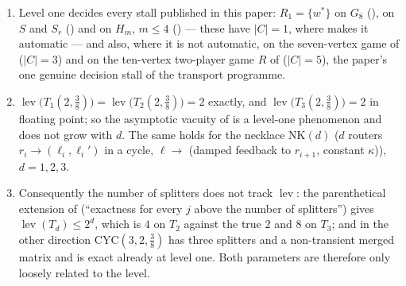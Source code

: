 \begin{proposition}\label{xc:stops}
\begin{enumerate}[label=(\alph*),leftmargin=2.2em]
\item Level one decides every stall published in this paper: $R_1=\{w^{\ast}\}$ on $G_8$
      (), on $S$ and $S_r$ () and on
      $H_m$, $m\le4$ () --- these have $|C|=1$, where
       makes it automatic --- and also, where it is not automatic, on the
      seven-vertex game of  ($|C|=3$) and on the ten-vertex two-player
      game $R$ of  ($|C|=5$), the paper's one genuine decision stall of
      the transport programme.
\item $\operatorname{lev}\bigl(T_1(2,\tfrac38)\bigr)=\operatorname{lev}\bigl(T_2(2,\tfrac38)\bigr)=2$
      exactly, and $\operatorname{lev}\bigl(T_3(2,\tfrac38)\bigr)=2$ in floating point; so the asymptotic vacuity
      of  is a level-one phenomenon and does not grow with $d$.  The
      same holds for the necklace $\mathrm{NK}(d)$ ($d$ routers $r_i\to(\ell_i,\ell_i')$ in a
      cycle, $\ell\to$ (damped feedback to $r_{i+1}$, constant $\kappa$)), $d=1,2,3$.
\item Consequently the number of splitters does not track $\operatorname{lev}$: the
      parenthetical extension of  (``exactness for every $j$ above the
      number of splitters'') gives $\operatorname{lev}(T_d)\le2^{d}$, which is $4$ on $T_2$
      against the true $2$ and $8$ on $T_3$; and in the other direction
      $\mathrm{CYC}(3,2,\tfrac38)$ has three splitters and a non-transient merged matrix and
      is exact already at level one.  Both parameters are therefore only loosely related to
      the level.
\end{enumerate}
\end{proposition}


